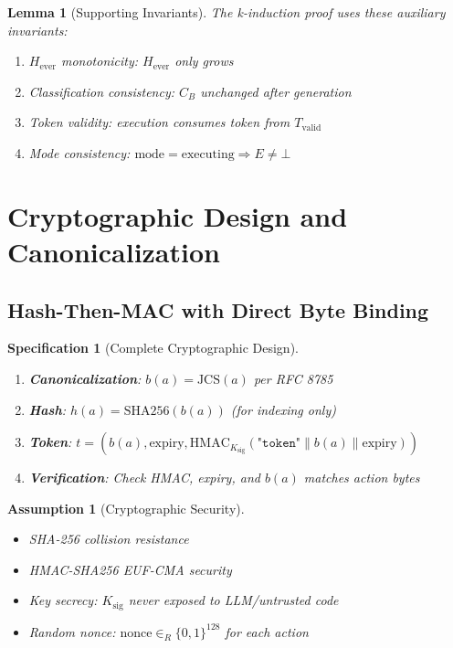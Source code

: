 \documentclass[12pt]{article}
\newtheorem{spec}{Specification}[section]
\newtheorem{assumption}{Assumption}[section]
\newtheorem{lemma}{Lemma}[section]
\begin{document}
\begin{lemma}[Supporting Invariants]
The k-induction proof uses these auxiliary invariants:
\begin{enumerate}
    \item $H_{\text{ever}}$ monotonicity: $H_{\text{ever}}$ only grows
    \item Classification consistency: $C_B$ unchanged after generation
    \item Token validity: execution consumes token from $T_{\text{valid}}$
    \item Mode consistency: $\text{mode}=\text{executing} \Rightarrow E \neq \bot$
\end{enumerate}
\end{lemma}

\section{Cryptographic Design and Canonicalization}

\subsection{Hash-Then-MAC with Direct Byte Binding}

\begin{spec}[Complete Cryptographic Design]
\begin{enumerate}
    \item \textbf{Canonicalization}: $b(a) = \mathrm{JCS}(a)$ per RFC 8785
    \item \textbf{Hash}: $h(a) = \mathrm{SHA256}(b(a))$ (for indexing only)
    \item \textbf{Token}: $t = (b(a), \text{expiry}, \mathrm{HMAC}_{K_{\text{sig}}}(\texttt{"token"}\|b(a)\|\text{expiry}))$
    \item \textbf{Verification}: Check HMAC, expiry, and $b(a)$ matches action bytes
\end{enumerate}
\end{spec}

\begin{assumption}[Cryptographic Security]
\begin{itemize}
    \item SHA-256 collision resistance
    \item HMAC-SHA256 EUF-CMA security
    \item Key secrecy: $K_{\text{sig}}$ never exposed to LLM/untrusted code
    \item Random nonce: $\text{nonce} \in_R \{0,1\}^{128}$ for each action
\end{itemize}
\end{assumption}
\end{document}
